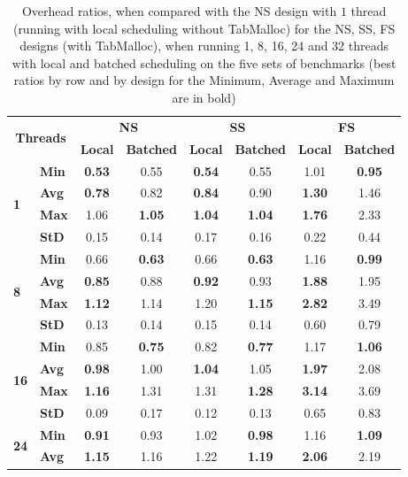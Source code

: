 \documentclass{llncs}
\begin{document}
\begin{table}[!ht]
\centering
\caption{Overhead ratios, when compared with the NS design with $1$
  thread (running with local scheduling without TabMalloc) for the NS,
  SS, FS designs (with TabMalloc), when running 1, 8, 16, 24 and 32
  threads with local and batched scheduling on the five sets of
  benchmarks (best ratios by row and by design for the Minimum,
  Average and Maximum are in bold)}
\begin{tabular}{ll|cc|cc|cc}
\hline\hline
\multicolumn{2}{c|}{\multirow{2}{*}{\bf Threads}} &
\multicolumn{2}{c|}{\multirow{1}{*}{\bf NS}} &
\multicolumn{2}{c}{\multirow{1}{*}{\bf SS}} & 
\multicolumn{2}{|c}{\multirow{1}{*}{\bf FS}}\\ \cline{3-8}
& 
& \multicolumn{1}{c}{\bf Local}
& \multicolumn{1}{c}{\bf Batched}
& \multicolumn{1}{|c}{\bf Local}
& \multicolumn{1}{c}{\bf Batched}
& \multicolumn{1}{|c}{\bf Local}
& \multicolumn{1}{c}{\bf Batched}\\
\hline
\multirow{4}{*}{\bf 1}
& {\bf Min }& {\bf 0.53}& 0.55& {\bf 0.54}& 0.55& 1.01& {\bf 0.95}\\
& {\bf Avg }& {\bf 0.78}& 0.82& {\bf 0.84}& 0.90& {\bf 1.30}& 1.46\\
& {\bf Max }& 1.06& {\bf 1.05}& {\bf 1.04}& {\bf 1.04}& {\bf 1.76}& 2.33\\
& {\bf StD }& 0.15& 0.14& 0.17& 0.16& 0.22& 0.44\\
\hline
\multirow{4}{*}{\bf 8}
& {\bf Min }& 0.66& {\bf 0.63}& 0.66& {\bf 0.63}& 1.16&{\bf  0.99}\\
& {\bf Avg }& {\bf 0.85}& 0.88& {\bf 0.92}& 0.93& {\bf 1.88}& 1.95\\
& {\bf Max }& {\bf 1.12}& 1.14& 1.20& {\bf 1.15}& {\bf 2.82}& 3.49\\
& {\bf StD }& 0.13& 0.14& 0.15& 0.14& 0.60& 0.79\\
\hline
\multirow{4}{*}{\bf 16}
& {\bf Min }& 0.85& {\bf 0.75}& 0.82& {\bf 0.77}& 1.17& {\bf 1.06}\\
& {\bf Avg }& {\bf 0.98}& 1.00& {\bf 1.04}& 1.05& {\bf 1.97}& 2.08\\
& {\bf Max }& {\bf 1.16}& 1.31& 1.31& {\bf 1.28}& {\bf 3.14}& 3.69\\
& {\bf StD }& 0.09& 0.17& 0.12& 0.13& 0.65& 0.83\\
\hline
\multirow{4}{*}{\bf 24}
& {\bf Min }& {\bf 0.91}& 0.93& 1.02& {\bf 0.98}& 1.16& {\bf 1.09}\\
& {\bf Avg }& {\bf 1.15}& 1.16& 1.22& {\bf 1.19}& {\bf 2.06}& 2.19\\

\end{tabular}
\end{table}
\end{document}
